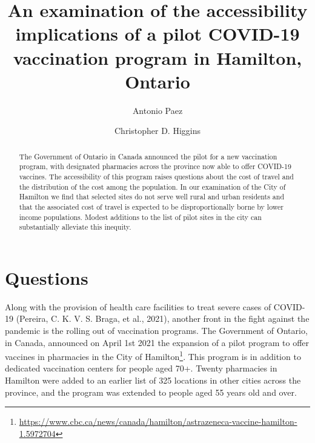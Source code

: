 \documentclass[]{elsarticle} %
\begin{document}
\begin{frontmatter}

  \title{An examination of the accessibility implications of a pilot COVID-19
vaccination program in Hamilton, Ontario}
    \author[McMaster University]{Antonio Paez}
    \author[University of Toronto Scarborough]{Christopher D. Higgins}
      \address[McMaster University]{School of Earth, Environment and Society, McMaster University, Hamilton,
ON, L8S 4K1, Canada}
    \address[University of Toronto Scarborough]{Department of Geography \& Planning, University of Toronto Scarborough,
1265 Military Trail, Toronto, ON M1C1A4}
  
  \begin{abstract}
  The Government of Ontario in Canada announced the pilot for a new
  vaccination program, with designated pharmacies across the province now
  able to offer COVID-19 vaccines. The accessibility of this program
  raises questions about the cost of travel and the distribution of the
  cost among the population. In our examination of the City of Hamilton we
  find that selected sites do not serve well rural and urban residents and
  that the associated cost of travel is expected to be disproportionally
  borne by lower income populations. Modest additions to the list of pilot
  sites in the city can substantially alleviate this inequity.
  \end{abstract}
  
 \end{frontmatter}

\hypertarget{questions}{%
\section{Questions}\label{questions}}

Along with the provision of health care facilities to treat severe cases
of COVID-19 (Pereira, C. K. V. S. Braga, et al., 2021), another front in
the fight against the pandemic is the rolling out of vaccination
programs. The Government of Ontario, in Canada, announced on April 1st
2021 the expansion of a pilot program to offer vaccines in pharmacies in
the City of
Hamilton\footnote{\url{https://www.cbc.ca/news/canada/hamilton/astrazeneca-vaccine-hamilton-1.5972704}}.
This program is in addition to dedicated vaccination centers for people
aged 70+. Twenty pharmacies in Hamilton were added to an earlier list of
325 locations in other cities across the province, and the program was
extended to people aged 55 years old and over.
\end{document}

